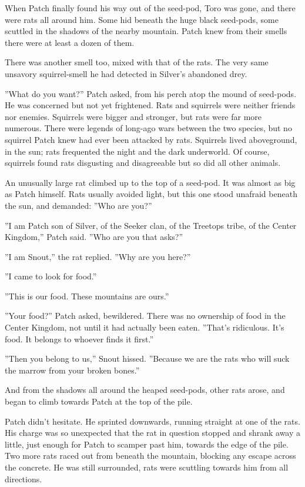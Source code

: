 \documentclass[12pt]{book}
\begin{document}
 When Patch finally found his way out of the seed-pod, Toro was gone, and there were rats all around him. Some hid beneath the huge black seed-pods, some scuttled in the shadows of the nearby mountain. Patch knew from their smells there were at least a dozen of them.\par
There was another smell too, mixed with that of the rats. The very same unsavory squirrel-smell he had detected in Silver's abandoned drey.\par
 ''What do you want?'' Patch asked, from his perch atop the mound of seed-pods. He was concerned but not yet frightened. Rats and squirrels were neither friends nor enemies. Squirrels were bigger and stronger, but rats were far more numerous. There were legends of long-ago wars between the two species, but no squirrel Patch knew had ever been attacked by rats. Squirrels lived aboveground, in the sun; rats frequented the night and the dark underworld. Of course, squirrels found rats disgusting and disagreeable %
 but so did all other animals.\par
 An unusually large rat climbed up to the top of a seed-pod. It was almost as big as Patch himself. Rats usually avoided light, but this one stood unafraid beneath the sun, and demanded: ''Who are you?''\par
 ''I am Patch son of Silver, of the Seeker clan, of the Treetops tribe, of the Center Kingdom,'' Patch said. ''Who are you that asks?''\par
 ''I am Snout,'' the rat replied. ''Why are you here?''\par
 ''I came to look for food.''\par
 ''This is our food. These mountains are ours.''\par
 ''Your food?'' Patch asked, bewildered. There was no ownership of food in the Center Kingdom, not until it had actually been eaten. ''That's ridiculous. It's food. It belongs to whoever finds it first.''\par
 ''Then you belong to us,'' Snout hissed. ''Because we are the rats who will suck the marrow from your broken bones.''\par
 And from the shadows all around the heaped seed-pods, other rats arose, and began to climb towards Patch at the top of the pile.\par
 Patch didn't hesitate. He sprinted downwards, running straight at one of the rats. His charge was so unexpected that the rat in question stopped and shrank away a little, just enough for Patch to scamper past him, towards the edge of the pile. Two more rats raced out from beneath the mountain, blocking any escape across the concrete. He was still surrounded, rats were scuttling towards him from all directions.\par
\end{document}
